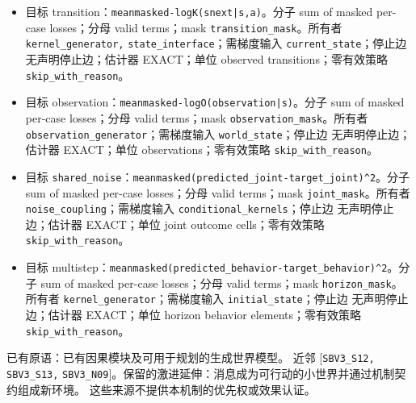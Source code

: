 \documentclass[
  10pt,
]{article}
\begin{document}
\begin{itemize}
\item
  目标
  transition：{\small\nolinkurl{mean}\hspace{0.333em}\nolinkurl{masked}\hspace{0.333em}\nolinkurl{-log}\hspace{0.333em}\nolinkurl{K(snext|s,a)}}。分子
  sum of masked per-case losses；分母 valid terms；mask
  \nolinkurl{transition_mask}。所有者 \nolinkurl{kernel_generator,}
  \nolinkurl{state_interface}；需梯度输入
  \nolinkurl{current_state}；停止边 无声明停止边；估计器 EXACT；单位
  observed transitions；零有效策略 \nolinkurl{skip_with_reason}。
\item
  目标
  observation：{\small\nolinkurl{mean}\hspace{0.333em}\nolinkurl{masked}\hspace{0.333em}\nolinkurl{-log}\hspace{0.333em}\nolinkurl{O(observation|s)}}。分子
  sum of masked per-case losses；分母 valid terms；mask
  \nolinkurl{observation_mask}。所有者
  \nolinkurl{observation_generator}；需梯度输入
  \nolinkurl{world_state}；停止边 无声明停止边；估计器 EXACT；单位
  observations；零有效策略 \nolinkurl{skip_with_reason}。
\item
  目标
  \nolinkurl{shared_noise}：{\small\nolinkurl{mean}\hspace{0.333em}\nolinkurl{masked}\hspace{0.333em}\nolinkurl{(predicted_joint-target_joint)^2}}。分子
  sum of masked per-case losses；分母 valid terms；mask
  \nolinkurl{joint_mask}。所有者 \nolinkurl{noise_coupling}；需梯度输入
  \nolinkurl{conditional_kernels}；停止边 无声明停止边；估计器
  EXACT；单位 joint outcome cells；零有效策略
  \nolinkurl{skip_with_reason}。
\item
  目标
  multistep：{\small\nolinkurl{mean}\hspace{0.333em}\nolinkurl{masked}\hspace{0.333em}\nolinkurl{(predicted_behavior-target_behavior)^2}}。分子
  sum of masked per-case losses；分母 valid terms；mask
  \nolinkurl{horizon_mask}。所有者
  \nolinkurl{kernel_generator}；需梯度输入
  \nolinkurl{initial_state}；停止边 无声明停止边；估计器 EXACT；单位
  horizon behavior elements；零有效策略 \nolinkurl{skip_with_reason}。
\end{itemize}

已有原语：已有因果模块及可用于规划的生成世界模型。 近邻
{[}\nolinkurl{SBV3_S12,} \nolinkurl{SBV3_S13,}
\nolinkurl{SBV3_N09}{]}。保留的激进延伸：消息成为可行动的小世界并通过机制契约组成新环境。
这些来源不提供本机制的优先权或效果认证。
\end{document}
